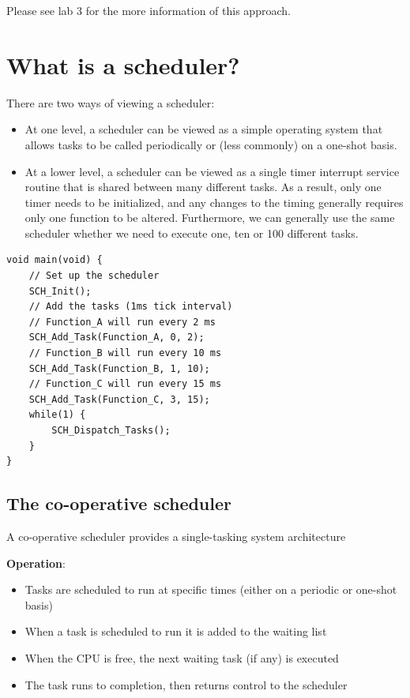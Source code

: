 \documentclass[twoside, final]{hcmut_report}
\begin{document}
Please see lab 3 for the more information of this approach. 

\section{What is a scheduler?}
There are two ways of viewing a scheduler:
\begin{itemize}
    \item  At one level, a scheduler can be viewed as a simple operating system that allows
tasks to be called periodically or (less commonly) on a one-shot basis.  
    \item  At a lower level, a scheduler can be viewed as a single timer interrupt service routine that is shared between many different tasks. As a result, only one timer needs to be  initialized, and any changes to the timing generally requires only one function to be altered. Furthermore, we can generally use the same scheduler whether we need to execute one, ten or 100 different tasks. 

\end{itemize}
\begin{lstlisting}[caption=Example of how a scheduler uses]
void main(void) {
    // Set up the scheduler
    SCH_Init();
    // Add the tasks (1ms tick interval)
    // Function_A will run every 2 ms
    SCH_Add_Task(Function_A, 0, 2);
    // Function_B will run every 10 ms
    SCH_Add_Task(Function_B, 1, 10);
    // Function_C will run every 15 ms
    SCH_Add_Task(Function_C, 3, 15);
    while(1) {
        SCH_Dispatch_Tasks();
    } 
}
\end{lstlisting}

\subsection{The co-operative scheduler}

 A co-operative scheduler provides a single-tasking system architecture

\textbf{Operation}:
\begin{itemize}
    \item Tasks are scheduled to run at specific times (either on a periodic or one-shot basis)
\item When a task is scheduled to run it is added to the waiting list
\item When the CPU is free, the next waiting task (if any) is executed
\item The task runs to completion, then returns control to the scheduler
\end{itemize}
\end{document}
